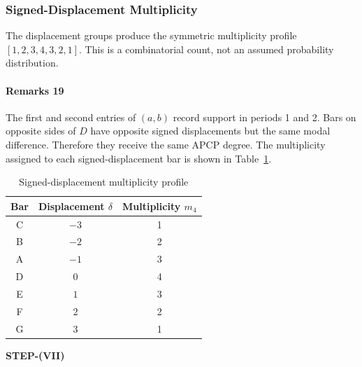 \documentclass[conference]{IEEEtran}
\theoremstyle{plain}
\theoremstyle{definition}
\theoremstyle{remark}
\begin{document}
	\subsubsection{Signed-Displacement Multiplicity}
	The displacement groups produce the symmetric multiplicity profile $[1,2,3,4,3,2,1]$. This is a combinatorial count, not an assumed probability distribution.
	\begin{center}
	\end{center}
	\paragraph{Remarks 19} The first and second entries of $(a,b)$ record support in periods 1 and 2. Bars on opposite sides of $D$ have opposite signed displacements but the same modal difference. Therefore they receive the same APCP degree.
	The multiplicity assigned to each signed-displacement bar is shown in Table~\ref{tab:table2}.
	\begin{table}[H]
		\begin{center}
			\caption{Signed-displacement multiplicity profile}
			\label{tab:table2}
			\begin{tabular}{|c|c|c|}
				\hline
				\textbf{Bar} & \textbf{Displacement $\delta$} & \textbf{Multiplicity $m_4$} \\
				\hline
				C & $-3$ & 1 \\
				B & $-2$ & 2 \\
				A & $-1$ & 3 \\
				D & $0$ & 4 \\
				E & $1$ & 3 \\
				F & $2$ & 2 \\
				G & $3$ & 1 \\
				\hline
			\end{tabular}
		\end{center}
	\end{table} 
	\begin{center}
		\textbf{STEP-(VII)}
	\end{center}
\end{document}
